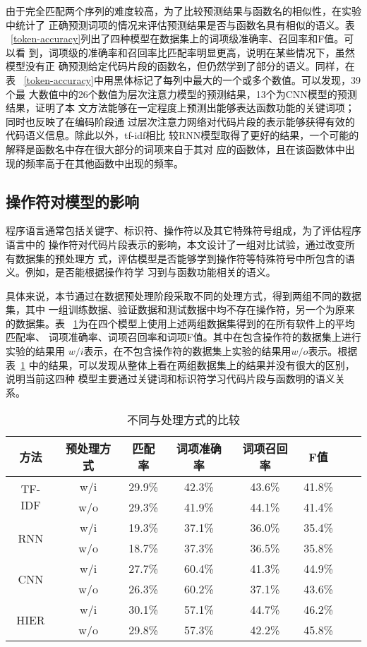 由于完全匹配两个序列的难度较高，为了比较预测结果与函数名的相似性，在实验中统计了
正确预测词项的情况来评估预测结果是否与函数名具有相似的语义。表
~\ref{token-accuracy}列出了四种模型在数据集上的词项级准确率、召回率和F值。可以看
到，词项级的准确率和召回率比匹配率明显更高，说明在某些情况下，虽然模型没有正
确预测给定代码片段的函数名，但仍然学到了部分的语义。同样，在表
~\ref{token-accuracy}中用黑体标记了每列中最大的一个或多个数值。可以发现，39个最
大数值中的26个数值为层次注意力模型的预测结果，13个为CNN模型的预测结果，证明了本
文方法能够在一定程度上预测出能够表达函数功能的关键词项；同时也反映了在编码阶段通
过层次注意力网络对代码片段的表示能够获得有效的代码语义信息。除此以外，tf-idf相比
较RNN模型取得了更好的结果，一个可能的解释是函数名中存在很大部分的词项来自于其对
应的函数体，且在该函数体中出现的频率高于在其他函数中出现的频率。

\subsection{操作符对模型的影响}
程序语言通常包括关键字、标识符、操作符以及其它特殊符号组成，为了评估程序语言中的
操作符对代码片段表示的影响，本文设计了一组对比试验，通过改变所有数据集的预处理方
式，评估模型是否能够学到操作符等特殊符号中所包含的语义。例如，是否能根据操作符学
习到与函数功能相关的语义。

具体来说，本节通过在数据预处理阶段采取不同的处理方式，得到两组不同的数据集，其中
一组训练数据、验证数据和测试数据中均不存在操作符，另一个为原来的数据集。表
~\ref{operator}为在四个模型上使用上述两组数据集得到的在所有软件上的平均匹配率、
词项准确率、词项召回率和词项F值。其中在包含操作符的数据集上进行实验的结果用
$w/i$表示，在不包含操作符的数据集上实验的结果用$w/o$表示。根据表~\ref{operator}
中的结果，可以发现从整体上看在两组数据集上的结果并没有很大的区别，说明当前这四种
模型主要通过关键词和标识符学习代码片段与函数明的语义关系。

\begin{table}[!t]
\zihaowu
\renewcommand{\arraystretch}{1.4}
\caption{不同与处理方式的比较}
\label{operator}
\centering
\begin{tabular}{cccccccc}
\toprule
 方法 &预处理方式 &匹配率 &词项准确率 &词项召回率 &F值\\ 
\midrule
\multirow{2}{*}{TF-IDF}&w/i&29.9\%&42.3\% &43.6\% &41.8\% \\ 
&w/o&29.3\% &41.9\% &44.1\% &41.4\% \\ 
\multirow{2}{*}{RNN}&w/i&19.3\% &37.1\% &36.0\%  &35.4\% \\ 
&w/o&18.7\% &37.3\% &36.5\% &35.8\% \\
\multirow{2}{*}{CNN}&w/i& 27.7\% &60.4\% &41.3\% &44.9\% \\ 
&w/o&26.3\% &60.2\% &37.1\% &43.6\% \\
\multirow{2}{*}{HIER}&w/i&30.1\% &57.1\% &44.7\% &46.2\% \\
&w/o&29.8\% &57.3\% &42.2\% &45.8\% \\
\bottomrule
\end{tabular}
\end{table}

